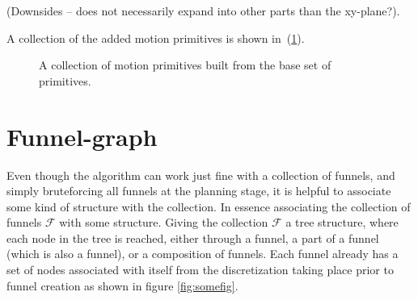 (Downsides -- does not necessarily expand into other parts than the xy-plane?).

A collection of the added motion primitives is shown in~(\ref{fig:expanded-motion-primitives}).

\begin{figure}
  \caption{A collection of motion primitives built from the base set of
    primitives.}
  \label{fig:expanded-motion-primitives}
\end{figure}

\subsection{}

\section{Funnel-graph}

Even though the \rrtfunnel{} algorithm can work just fine with a collection of
funnels, and simply bruteforcing all funnels at the planning stage, it is
helpful to associate some kind of structure with the collection. In essence
associating the collection of funnels \(\mathcal{F}\) with some structure.
Giving the collection \(\mathcal{F}\) a tree structure, where each node in the
tree is reached, either through a funnel, a part of a funnel (which is also a
funnel), or a composition of funnels. Each funnel already has a set of nodes
associated with itself from the discretization taking place prior to funnel
creation as shown in figure \ref{fig:somefig}.


